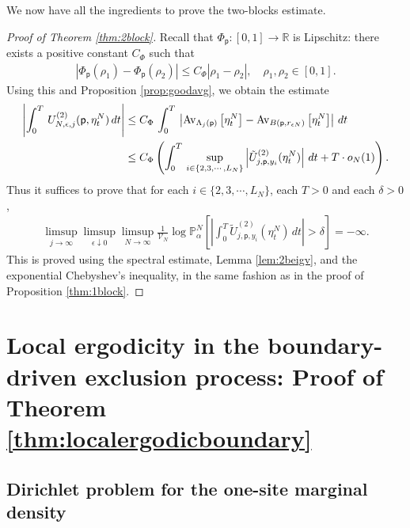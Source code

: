 \documentclass[11pt]{amsart}
\theoremstyle{plain}
\theoremstyle{definition}
\theoremstyle{remark}
\newcommand{\pt}{\mathsf{p}}
\newcommand{\Utwo}[3]{U^{(2)}_{{#1},{#2},{#3}}}
\newcommand{\Utildetwo}[3]{\tilde{U}^{(2)}_{{#1},{#2},{#3}}}
\newcommand{\avg}[2]{{\rm Av}_{#2}\left[{#1}\right]}
\begin{document}
We now have all the ingredients to prove the two-blocks estimate.

\begin{proof}[Proof of Theorem \ref{thm:2block}]
Recall that $\Phi_\pt: [0,1] \to \mathbb{R}$ is Lipschitz: there exists a positive constant $C_\Phi$ such that
\begin{align*}
\left|\Phi_\pt(\rho_1)- \Phi_\pt(\rho_2)\right| \leq C_\Phi |\rho_1-\rho_2|, \quad \rho_1,\rho_2 \in [0,1].
\end{align*}
Using this and Proposition \ref{prop:goodavg}, we obtain the estimate
\begin{align*}
\left|\int_0^T \, \Utwo{N}{\epsilon}{j}(\pt,\eta^N_t)\,dt\right|
& \leq  C_\Phi \,\int_0^T \,\left| \avg{\eta^N_t}{\Lambda_j(\pt)} - \avg{\eta^N_t}{B(\pt, r_{\epsilon N})}\right| \,dt\\
&\leq C_\Phi \left(\int_0^T \, \sup_{i\in \{2,3,\cdots, L_N\}}  \left|\Utildetwo{j}{\pt}{y_i}(\eta_t^N)\right|\,dt+T \cdot o_N(1)\right).
\end{align*}
Thus it suffices to prove that for each $i\in \{2,3,\cdots, L_N\}$, each $T>0$ and each $\delta>0$,
\begin{align*}
\limsup_{j\to\infty} \limsup_{\epsilon\downarrow 0} \limsup_{N\to\infty} \frac{1}{\mathcal{V}_N}\log \mathbb{P}^N_\alpha\left[ \left|\int_0^T\Utildetwo{j}{\pt}{y_i}(\eta^N_t)  \,dt\right|>\delta\right] = -\infty.
\end{align*}
This is proved using the spectral estimate, Lemma \ref{lem:2beigv}, and the exponential Chebyshev's inequality, in the same fashion as in the proof of Proposition \ref{thm:1block}.
\end{proof}

\section{Local ergodicity in the boundary-driven exclusion process: Proof of Theorem \ref{thm:localergodicboundary}} \label{sec:boundary}

\subsection{Dirichlet problem for the one-site marginal density} \label{sec:dirichlet}
\end{document}

